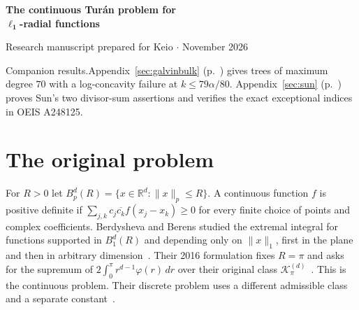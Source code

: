 \documentclass[11pt,a4paper]{article}
\numberwithin{equation}{section}
\begin{document}
\begin{center}
{\LARGE\bfseries\color{ink} The continuous Tur\'an problem for\\[3pt] $\boldsymbol{\ell_1}$-radial functions\par}
\vspace{5pt}{\large An exact extremizer, stability, and sums of Euclidean norms}\par\vspace{7pt}
{\small Research manuscript prepared for Keio \enspace$\cdot$ November 2026}
\end{center}
\begin{abstract}
Among continuous positive definite functions $f(x)=\varphi(\|x\|_1)$ on $\mathbb R^d$, normalized by $f(0)=1$ and supported in the cross-polytope of radius $R$, we prove that the largest integral is $R^d/(2^{d-1}d!)$. This determines the continuous extremal problem studied by Berdysheva and Berens and proves their conjectured separation from the unrestricted problem in every $d\ge2$. The unique extremizer is a beta average of the normalized Euclidean ball covariogram. If the integral is a fraction $1-\delta$ of the optimum, its uniform distance from the extremizer is at most $2\sqrt\delta$, and the exponent is optimal. We derive these conclusions from a correspondence that preserves the support radius, including a local inversion excluding cancellations in signed profiles. The same argument gives exact sharp constants for sums of Euclidean block norms and an explicit solution for a family of quadratic weights. Two independent appendices answer a question of Galvin on tree log-concavity and conjectures of Sun on central binomial and Catalan numbers.
\end{abstract}
\noindent\textsf{Companion results.}\enspace Appendix~\ref{sec:galvinbulk} (p.~\pageref{sec:galvinbulk}) gives trees of maximum degree $70$ with a log-concavity failure at $k\le79\alpha/80$. Appendix~\ref{sec:sun} (p.~\pageref{sec:sun}) proves Sun's two divisor-sum assertions and verifies the exact exceptional indices in OEIS A248125.
\section{The original problem}
For $R>0$ let $B_p^d(R)=\{x\in\mathbb R^d:\|x\|_p\le R\}$. A continuous function $f$ is positive definite if $\sum_{j,k} c_j\overline{c_k}f(x_j-x_k)\ge0$ for every finite choice of points and complex coefficients. Berdysheva and Berens studied the extremal integral for functions supported in $B_1^d(R)$ and depending only on $\|x\|_1$, first in the plane and then in arbitrary dimension~\cite{BB05,BB09}. Their 2016 formulation fixes $R=\pi$ and asks for the supremum of $2\int_0^\pi r^{d-1}\varphi(r)\,dr$ over their original class $\mathcal K_\pi^{(d)}$~\cite[Sec.~3, Problem~1, eq.~(4)]{BB16}. This is the continuous problem. Their discrete problem uses a different admissible class and a separate constant~\cite{BB14}.
\end{document}
